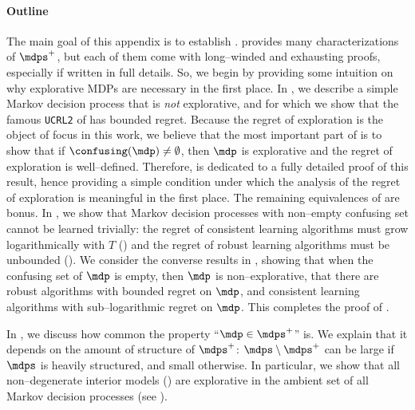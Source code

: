 \documentclass[preprint,cleveref,12pt]{colt2025}
\def\model{\mdp}
\def\models{\mdps}
\begin{document}
    \paragraph{Outline}
    The main goal of this appendix is to establish .
     provides many characterizations of $\models^+$, but each of them come with long--winded and exhausting proofs, especially if written in full details. 
    So, we begin by providing some intuition on why explorative MDPs are necessary in the first place. 
    In , we describe a simple Markov decision process that is \emph{not} explorative, and for which we show that the famous \texttt{UCRL2} of \cite{auer_near_optimal_2009} has bounded regret. 
    Because the regret of exploration is the object of focus in this work, we believe that the most important part of  is to show that if $\confusing(\model) \ne \emptyset$, then $\model$ is explorative and the regret of exploration is well--defined. 
    Therefore,  is dedicated to a fully detailed proof of this result, hence providing a simple condition under which the analysis of the regret of exploration is meaningful in the first place.
    The remaining equivalences of  are bonus.
    In , we show that Markov decision processes with non--empty confusing set cannot be learned trivially: the regret of consistent learning algorithms must grow logarithmically with $T$ () and the regret of robust learning algorithms must be unbounded ().
    We consider the converse results in , showing that when the confusing set of $\model$ is empty, then $\model$ is non--explorative, that there are robust algorithms with bounded regret on $\model$, and consistent learning algorithms with sub--logarithmic regret on $\model$.
    This completes the proof of .

    In , we discuss how common the property ``$\model \in \models^+$'' is.
    We explain that it depends on the amount of structure of $\models^+$: $\models \setminus \models^+$ can be large if $\models$ is heavily structured, and small otherwise.
    In particular, we show that all non--degenerate interior models () are explorative in the ambient set of all Markov decision processes (see ). 
\end{document}
